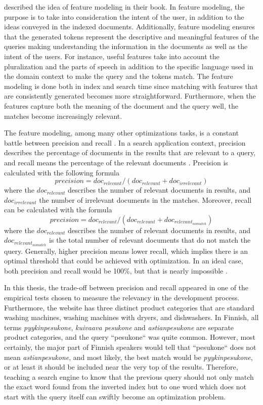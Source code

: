 \citeauthor{relevantSearch} \cite{relevantSearch} described the idea of feature modeling in their book.
In feature modeling, the purpose is to take into consideration the intent of the user, 
in addition to the ideas conveyed in the indexed documents.
Additionally, feature modeling ensures that the generated tokens represent the descriptive and meaningful
features of the queries making understanding the information in the documents as well as the intent of the users.
For instance, useful features take into account the pluralization and the parts of speech in addition to the specific language
used in the domain context to make the query and the tokens match.
The feature modeling is done both in index and search time
since matching with features that are consistently generated becomes more straightforward. 
Furthermore, when the features capture both the meaning of the document and the query well, 
the matches become increasingly relevant.
\cite{relevantSearch}

The feature modeling, among many other optimizations tasks, is a constant battle between 
precision and recall \cite{relevantSearch}.
In a search application context, precision describes the percentage of documents in the results 
that are relevant to a query, and recall means the percentage of the relevant documents \cite{relevantSearch}.
Precision is calculated with the following formula
\[ precision = doc_{relevant} / (doc_{relevant} + doc_{irrelevant}) \]
where the $doc_{relevant}$ describes the number of relevant documents in results, and $doc_{irrelevant}$
the number of irrelevant documents in the matches.
Moreover, recall can be calculated with the formula
\[ precision = doc_{relevant} / (doc_{relevant} + doc_{relevant_{no match}}) \]
where the $doc_{relevant}$ describes the number of relevant documents in results, 
and $doc_{relevant_{no match}}$ is the total number of relevant documents that do not match
the query.
Generally, higher precision means lower recall, which implies there is an optimal threshold 
that could be achieved with optimization.
In an ideal case, both precision and recall would be 100\%, but that is nearly impossible \cite{relevantSearch}.


In this thesis, the trade-off between precision and recall appeared in one of the empirical tests 
chosen to measure the relevancy in the development process.
Furthermore, the website has three distinct product categories that are standard washing machines,
washing machines with dryers, and dishwashers.
In Finnish, all terms
\emph{pyykinpesukone}, \emph{kuivaava pesukone} and \emph{astianpesukone} 
are separate product categories, and the query ``pesukone`` was quite common.
However, most certainly, the major part of Finnish speakers would tell that ``pesukone`` does not mean 
\emph{astianpesukone}, and most likely, the best match would be \emph{pyykinpesukone}, or 
at least it should be included near the very top of the results.
Therefore, teaching a search engine to know that the previous query 
should not only match the exact word found from the inverted index 
but to one word which does not start with the query itself can swiftly become an optimization problem.


